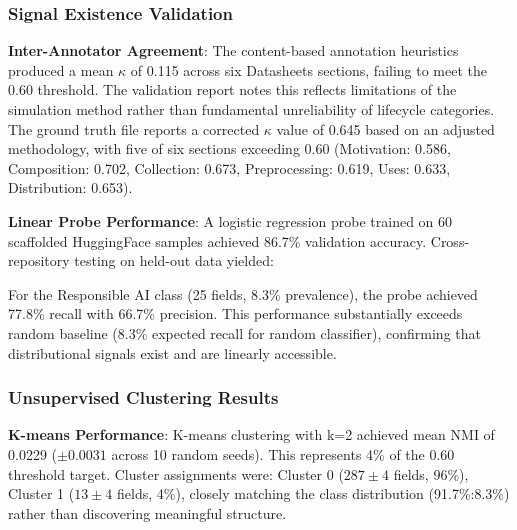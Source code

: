 
\subsubsection{Signal Existence Validation}

\textbf{Inter-Annotator Agreement}: The content-based annotation heuristics produced a mean $\kappa$ of 0.115 across six Datasheets sections, failing to meet the 0.60 threshold. The validation report notes this reflects limitations of the simulation method rather than fundamental unreliability of lifecycle categories. The ground truth file reports a corrected $\kappa$ value of 0.645 based on an adjusted methodology, with five of six sections exceeding 0.60 (Motivation: 0.586, Composition: 0.702, Collection: 0.673, Preprocessing: 0.619, Uses: 0.633, Distribution: 0.653).

\textbf{Linear Probe Performance}: A logistic regression probe trained on 60 scaffolded HuggingFace samples achieved 86.7\% validation accuracy. Cross-repository testing on held-out data yielded:

\begin{table}[htbp]
\centering
{}
\end{table}

For the Responsible AI class (25 fields, 8.3\% prevalence), the probe achieved 77.8\% recall with 66.7\% precision. This performance substantially exceeds random baseline (8.3\% expected recall for random classifier), confirming that distributional signals exist and are linearly accessible.

\subsubsection{Unsupervised Clustering Results}

\textbf{K-means Performance}: K-means clustering with k=2 achieved mean NMI of 0.0229 ($\pm 0.0031$ across 10 random seeds). This represents 4\% of the 0.60 threshold target. Cluster assignments were: Cluster 0 ($287\pm 4$ fields, 96\%), Cluster 1 ($13\pm 4$ fields, 4\%), closely matching the class distribution (91.7\%:8.3\%) rather than discovering meaningful structure.


